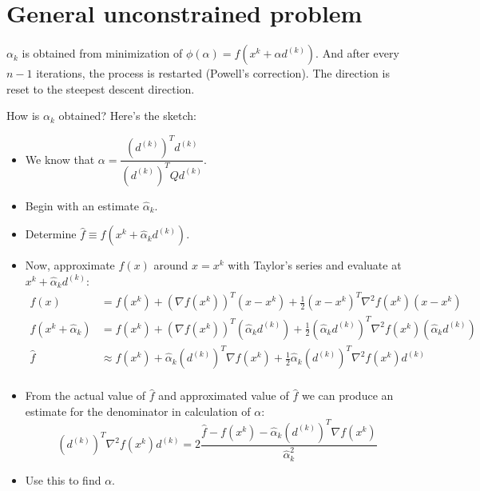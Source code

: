\documentclass[11pt]{article}
\begin{document}
\section*{General unconstrained problem}
$\alpha_k$ is obtained from minimization of $\phi(\alpha)=f(x^k+\alpha d^{(k)})$.
And after every $n-1$ iterations, the process is restarted (Powell's correction).
The direction is reset to the steepest descent direction.\par
%
How is $\alpha_k$ obtained? Here's the sketch:
\begin{itemize}
    \item We know that $\alpha=\dfrac{(d^{(k)})^Td^{(k)}}{(d^{(k)})^TQd^{(k)}}$.
    \item Begin with an estimate $\hat{\alpha}_k$.
    \item Determine $\hat{f}\equiv f(x^k+\hat{\alpha}_kd^{(k)})$.
    \item Now, approximate $f(x)$ around $x=x^k$ with Taylor's series and
        evaluate at $x^k+\hat{\alpha}_kd^{(k)}$:
        \begin{align*}
            f(x)&=f(x^k)+(\nabla f(x^k))^T(x-x^k)+\frac{1}{2}(x-x^k)^T%
            \nabla^2f(x^k)(x-x^k)\\
            f(x^k+\hat{\alpha}_k)&=f(x^k)+(\nabla f(x^k))^T(\hat{\alpha}_kd^{(k)})%
            +\frac{1}{2}(\hat{\alpha}_kd^{(k)})^T\nabla^2f(x^k)(\hat{\alpha}_kd^{(k)})\\
            \hat{f}&\approx f(x^k)+\hat{\alpha}_k(d^{(k)})^T\nabla f(x^k)+%
            \frac{1}{2}\hat{\alpha}_k(d^{(k)})^T\nabla^2f(x^k)d^{(k)}\\
        \end{align*}
    \item From the actual value of $\hat{f}$ and approximated value of $\hat{f}$
        we can produce an estimate for the denominator in calculation of $\alpha$:
        \[(d^{(k)})^T\nabla^2f(x^k)d^{(k)} = 2\dfrac{\hat{f}-f(x^k) -\hat{\alpha}_k(d^{(k)})^T\nabla f(x^k)}%
        {\hat{\alpha}_k^2}\]
    \item Use this to find $\alpha$.
\end{itemize}
\end{document}
